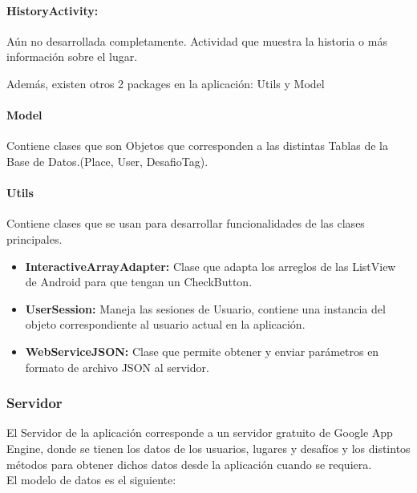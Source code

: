 \documentclass[10pt,letterpaper]{article}
\begin{document}
\paragraph{HistoryActivity:} Aún no desarrollada completamente. Actividad que muestra la historia o más información sobre el lugar.

\newpage
Además, existen otros 2 packages en la aplicación: Utils y Model\\

\paragraph{Model}

Contiene clases que son Objetos que corresponden a las distintas Tablas de la Base de Datos.(Place, User, DesafioTag).\\

\paragraph{Utils}

Contiene clases que se usan para desarrollar funcionalidades de las clases principales.\\

\begin{itemize}
 \item \textbf{InteractiveArrayAdapter:} Clase que adapta los arreglos de las ListView de Android para que tengan un CheckButton.
 \item \textbf{UserSession:} Maneja las sesiones de Usuario, contiene una instancia del objeto correspondiente al usuario actual en la aplicación.
 \item \textbf{WebServiceJSON:} Clase que permite obtener y enviar parámetros en formato de archivo JSON al servidor.
\end{itemize}

\subsubsection{Servidor}

El Servidor de la aplicación corresponde a un servidor gratuito de Google App Engine, donde se tienen los datos de los usuarios, lugares y desafíos y los distintos métodos para obtener dichos datos desde la aplicación cuando se requiera.\\

El modelo de datos es el siguiente:\\
\end{document}

